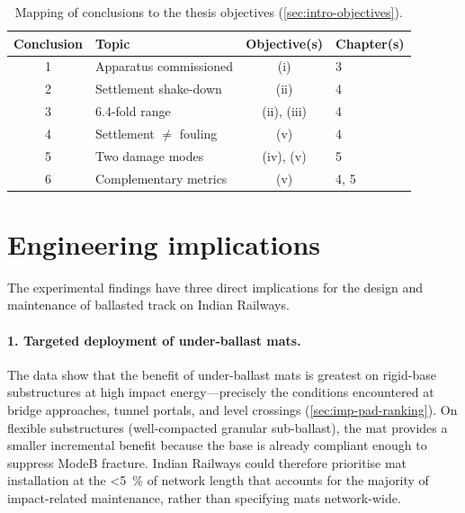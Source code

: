 \begin{table}[ht]
\centering
\caption{Mapping of conclusions to the thesis objectives
         (\cref{sec:intro-objectives}).}
\label{tab:concl-obj-map}
\small
{}
\begin{tabular}{@{}clcl@{}}
    \toprule
    \rowcolor{tablehdr}
    {\color{white}\textbf{Conclusion}}
    & {\color{white}\textbf{Topic}}
    & {\color{white}\textbf{Objective(s)}}
    & {\color{white}\textbf{Chapter(s)}}\\
    \midrule
    1 & Apparatus commissioned     & (i)        & 3\\
    2 & Settlement shake-down      & (ii)       & 4\\
    3 & \FIIN{} 6.4-fold range     & (ii), (iii)& 4\\
    4 & Settlement $\neq$ fouling  & (v)        & 4\\
    5 & Two damage modes           & (iv), (v)  & 5\\
    6 & Complementary metrics      & (v)        & 4, 5\\
    \bottomrule
\end{tabular}
\end{table}

\section{Engineering implications}
\label{sec:concl-engineering}

The experimental findings have three direct implications for the design
and maintenance of ballasted track on Indian Railways.

\paragraph{1. Targeted deployment of under-ballast mats.}
The data show that the benefit of under-ballast mats is greatest on
rigid-base substructures at high impact energy---precisely the conditions
encountered at bridge approaches, tunnel portals, and level crossings
(\cref{sec:imp-pad-ranking}). On flexible substructures (well-compacted
granular sub-ballast), the mat provides a smaller incremental benefit
because the base is already compliant enough to suppress \gls{ModeB}
fracture. Indian Railways could therefore prioritise mat installation at
the \SI{<5}{\percent} of network length that accounts for the majority
of impact-related maintenance, rather than specifying mats network-wide.

